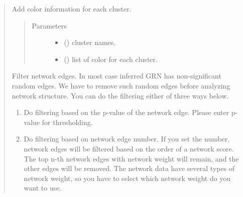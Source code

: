 \documentclass[letterpaper,10pt,english]{sphinxmanual}
\begin{document}
\begin{quote}
\begin{fulllineitems}
\begin{fulllineitems}
\end{fulllineitems}


\begin{fulllineitems}
\label{\detokenize{modules/celloracle.network_analysis:celloracle.network_analysis.Links.add_palette}}
Add color information for each cluster.
\begin{quote}\begin{description}
\item[{Parameters}] \leavevmode\begin{itemize}
\item {} 
 () \textendash{} cluster names.

\item {} 
 () \textendash{} list of color for each cluster.

\end{itemize}

\end{description}\end{quote}

\end{fulllineitems}


\begin{fulllineitems}
\label{\detokenize{modules/celloracle.network_analysis:celloracle.network_analysis.Links.filter_links}}
Filter network edges.
In most case inferred GRN has non-significant random edges.
We have to remove such random edges before analyzing network structure.
You can do the filtering either of three ways below.
\begin{enumerate}
\item {} 
Do filtering based on the p-value of the network edge.
Please enter p-value for thresholding.

\item {} 
Do filtering based on network edge number.
If you set the number, network edges will be filtered based on the order of a network score. The top n-th network edges with network weight will remain, and the other edges will be removed.
The network data have several types of network weight, so you have to select which network weight do you want to use.


\end{enumerate}
\end{fulllineitems}
\end{fulllineitems}
\end{quote}
\end{document}
